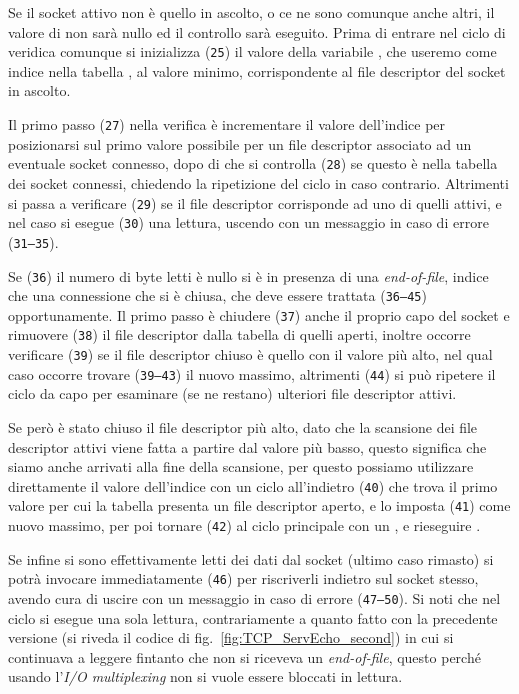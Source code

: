 Se il socket attivo non è quello in ascolto, o ce ne sono comunque anche
altri, il valore di  non sarà nullo ed il controllo sarà
eseguito. Prima di entrare nel ciclo di veridica comunque si inizializza
(\texttt{\small 25}) il valore della variabile , che useremo come
indice nella tabella , al valore minimo, corrispondente al file
descriptor del socket in ascolto.

Il primo passo (\texttt{\small 27}) nella verifica è incrementare il valore
dell'indice  per posizionarsi sul primo valore possibile per un file
descriptor associato ad un eventuale socket connesso, dopo di che si controlla
(\texttt{\small 28}) se questo è nella tabella dei socket connessi, chiedendo
la ripetizione del ciclo in caso contrario. Altrimenti si passa a verificare
(\texttt{\small 29}) se il file descriptor corrisponde ad uno di quelli
attivi, e nel caso si esegue (\texttt{\small 30}) una lettura, uscendo con un
messaggio in caso di errore (\texttt{\small 31--35}).

Se (\texttt{\small 36}) il numero di byte letti  è nullo si è in
presenza di una \textit{end-of-file}, indice che una connessione che si è
chiusa, che deve essere trattata (\texttt{\small 36--45}) opportunamente.  Il
primo passo è chiudere (\texttt{\small 37}) anche il proprio capo del socket e
rimuovere (\texttt{\small 38}) il file descriptor dalla tabella di quelli
aperti, inoltre occorre verificare (\texttt{\small 39}) se il file descriptor
chiuso è quello con il valore più alto, nel qual caso occorre trovare
(\texttt{\small 39--43}) il nuovo massimo, altrimenti (\texttt{\small 44}) si
può ripetere il ciclo da capo per esaminare (se ne restano) ulteriori file
descriptor attivi.

Se però è stato chiuso il file descriptor più alto, dato che la scansione dei
file descriptor attivi viene fatta a partire dal valore più basso, questo
significa che siamo anche arrivati alla fine della scansione, per questo
possiamo utilizzare direttamente il valore dell'indice  con un ciclo
all'indietro (\texttt{\small 40}) che trova il primo valore per cui la tabella
presenta un file descriptor aperto, e lo imposta (\texttt{\small 41}) come
nuovo massimo, per poi tornare (\texttt{\small 42}) al ciclo principale con un
, e rieseguire .

Se infine si sono effettivamente letti dei dati dal socket (ultimo caso
rimasto) si potrà invocare immediatamente (\texttt{\small 46})
 per riscriverli indietro sul socket stesso, avendo cura di
uscire con un messaggio in caso di errore (\texttt{\small 47--50}). Si noti
che nel ciclo si esegue una sola lettura, contrariamente a quanto fatto con la
precedente versione (si riveda il codice di fig.~\ref{fig:TCP_ServEcho_second})
in cui si continuava a leggere fintanto che non si riceveva un
\textit{end-of-file}, questo perché usando l'\textit{I/O multiplexing} non si
vuole essere bloccati in lettura.  

